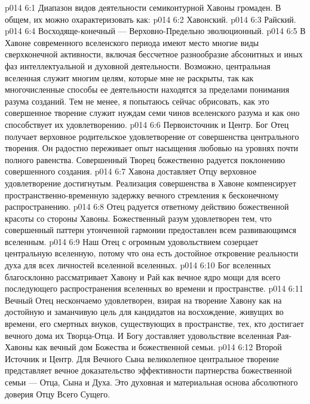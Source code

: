 \vs p014 6:1 Диапазон видов деятельности семиконтурной Хавоны громаден. В общем, их можно охарактеризовать как:
\vs p014 6:2 \bibnobreakspace Хавонский.
\vs p014 6:3 \bibnobreakspace Райский.
\vs p014 6:4 \bibnobreakspace Восходяще\hyp{}конечный --- Верховно\hyp{}Предельно эволюционный.
\vs p014 6:5 \pc В Хавоне современного вселенского периода имеют место многие виды сверхконечной активности, включая бессчетное разнообразие абсонитных и иных фаз интеллектуальной и духовной деятельности. Возможно, центральная вселенная служит многим целям, которые мне не раскрыты, так как многочисленные способы ее деятельности находятся за пределами понимания разума созданий. Тем не менее, я попытаюсь сейчас обрисовать, как это совершенное творение служит нуждам семи чинов вселенского разума и как оно способствует их удовлетворению.
\vs p014 6:6 \pc {}\bibnobreakspace {} Первоисточник и Центр. Бог Отец получает верховное родительское удовлетворение от совершенства центрального творения. Он радостно переживает опыт насыщения любовью на уровнях почти полного равенства. Совершенный Творец божественно радуется поклонению совершенного создания.
\vs p014 6:7 Хавона доставляет Отцу верховное удовлетворение достигнутым. Реализация совершенства в Хавоне компенсирует пространственно\hyp{}временную задержку вечного стремления к бесконечному распространению.
\vs p014 6:8 Отец радуется ответному действию божественной красоты со стороны Хавоны. Божественный разум удовлетворен тем, что совершенный паттерн утонченной гармонии предоставлен всем развивающимся вселенным.
\vs p014 6:9 Наш Отец с огромным удовольствием созерцает центральную вселенную, потому что она есть достойное откровение реальности духа для всех личностей вселенной вселенных.
\vs p014 6:10 Бог вселенных благосклонно рассматривает Хавону и Рай как вечное ядро мощи для всего последующего распространения вселенных во времени и пространстве.
\vs p014 6:11 Вечный Отец нескончаемо удовлетворен, взирая на творение Хавону как на достойную и заманчивую цель для кандидатов на восхождение, живущих во времени, его смертных внуков, существующих в пространстве, тех, кто достигает вечного дома их Творца\hyp{}Отца. И Богу доставляет удовольствие вселенная Рая\hyp{}Хавоны как вечный дом Божества и божественной семьи.
\vs p014 6:12 \pc {}\bibnobreakspace {} Второй Источник и Центр. Для Вечного Сына великолепное центральное творение представляет вечное доказательство эффективности партнерства божественной семьи --- Отца, Сына и Духа. Это духовная и материальная основа абсолютного доверия Отцу Всего Сущего.
